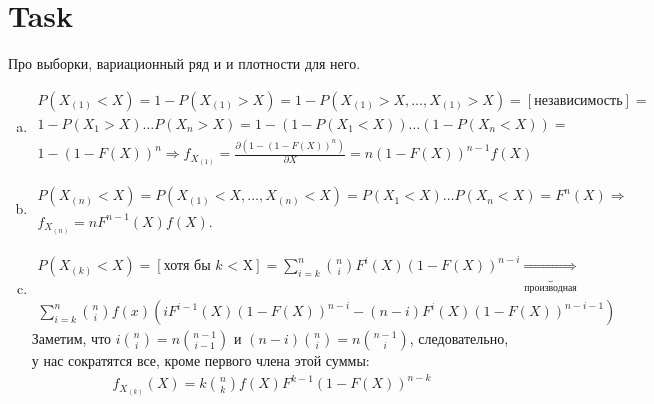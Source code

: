 \section{Task}
\begin{task}
    Про выборки, вариационный ряд и и плотности для него.
\end{task}

\begin{solution}
    \begin{enumerate}[a)]
        \item 
        \begin{gather}
            P(X_{(1)} < X)  = 1 - P(X_{(1)} > X) = 1 - P(X_{(1)} > X, \ldots, X_{(1)} > X) = [\text{независимость}] = \\ 
            1 - P(X_1 > X)\ldots P(X_n > X) = 1 - (1 - P(X_1 < X))\ldots(1 - P(X_n < X)) = \\
             1 - (1 - F(X))^n \Longrightarrow f_{X_{(1)}} = \frac{\partial (1 - (1 - F(X))^n)}{\partial X} = n(1 - F(X))^{n-1}f(X)
        \end{gather}
        \item
        \begin{gather}
            P(X_{(n)} < X) = P(X_{(1)} < X, \ldots, X_{(n)} < X) = P(X_1 < X)\ldots P(X_n < X) = F^n(X) \Longrightarrow \\
            f_{X_{(n)}} = nF^{n-1}(X)f(X).
        \end{gather}
        \item
        \begin{gather}
            P(X_{(k)} < X) = [\text{хотя бы }k\text{ < X}] = \sum\limits_{i=k}^n {n\choose i} F^i(X)(1 - F(X))^{n - i} \underbrace{\Longrightarrow}_{\text{производная}} \\
            \sum\limits_{i=k}^{n} {n\choose i} f(x) \left(iF^{i-1}(X)(1-F(X))^{n-i} - (n - i)F^i(X)(1-F(X))^{n-i-1}\right)
        \end{gather}
        Заметим, что $i{n\choose i} = n {n - 1 \choose i - 1}$ и $(n-i){n\choose i} = n {n-1\choose i}$, следовательно, у нас сократятся все, кроме первого члена этой суммы:
        \begin{gather}
            f_{X_{(k)}}(X) = k{n\choose k} f(X)F^{k - 1}(1 - F(X))^{n-k}
        \end{gather}
    \end{enumerate}
\end{solution}